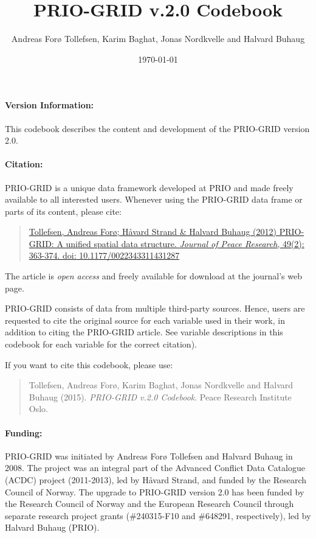 \documentclass[]{book}
\title{PRIO-GRID v.2.0 Codebook}
\author{Andreas Forø Tollefsen, Karim Baghat, Jonas Nordkvelle and Halvard
Buhaug}
\date{\today}
\begin{document}
\frontmatter
\maketitle

\paragraph{Version Information:}\label{version-information}

This codebook describes the content and development of the PRIO-GRID
version 2.0.

\paragraph{Citation:}\label{citation}

PRIO-GRID is a unique data framework developed at PRIO and made freely
available to all interested users. Whenever using the PRIO-GRID data
frame or parts of its content, please cite:

\begin{quote}
\href{http://jpr.sagepub.com/content/49/2/363}{Tollefsen, Andreas Forø;
Håvard Strand \& Halvard Buhaug (2012) PRIO-GRID: A unified spatial data
structure. \emph{Journal of Peace Research}, 49(2): 363-374. doi:
10.1177/0022343311431287}
\end{quote}

The article is \emph{open access} and freely available for download at
the journal's web page.

PRIO-GRID consists of data from multiple third-party sources. Hence,
users are requested to cite the original source for each variable used
in their work, in addition to citing the PRIO-GRID article. See variable
descriptions in this codebook for each variable for the correct
citation).

If you want to cite this codebook, please use:

\begin{quote}
Tollefsen, Andreas Forø, Karim Baghat, Jonas Nordkvelle and Halvard
Buhaug (2015). \emph{PRIO-GRID v.2.0 Codebook}. Peace Research Institute
Oslo.
\end{quote}

\paragraph{Funding:}\label{funding}

PRIO-GRID was initiated by Andreas Forø Tollefsen and Halvard Buhaug in
2008. The project was an integral part of the Advanced Conflict Data
Catalogue (ACDC) project (2011-2013), led by Håvard Strand, and funded
by the Research Council of Norway. The upgrade to PRIO-GRID version 2.0
has been funded by the Research Council of Norway and the European
Research Council through separate research project grants (\#240315-F10
and \#648291, respectively), led by Halvard Buhaug (PRIO).
\end{document}
